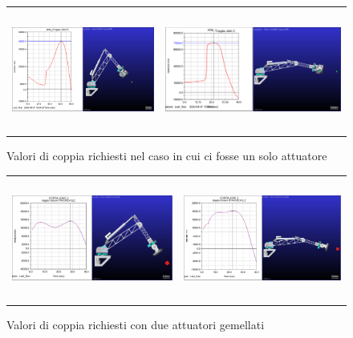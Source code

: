 \documentclass[%
corpo=11pt,
twoside,
 stile=classica,
oldstyle,
greek,%
]{toptesi}
\begin{document}
		\begin{figure}[!ht]
			\centering
			\begin{tabular}{ll}
				\includegraphics[height=4cm,keepaspectratio]{Plots/SPALLA/1motore/JOINT2_conservativo.png}
				&
				\includegraphics[height=4cm,keepaspectratio]{Plots/SPALLA/1motore/JOINT2-torque.png}
			\end{tabular}
			\caption{Valori di coppia richiesti nel caso in cui ci fosse un solo attuatore}
			\label{fig:MBDJoint21motore}
		\end{figure}
		\begin{figure} [!ht]
			\centering
			\begin{tabular}{ll}
				\includegraphics[height=4cm,keepaspectratio]{Plots/SPALLA/2motori/JOINT22favorevole.png}
				&
				\includegraphics[height=4cm,keepaspectratio]{Plots/SPALLA/2motori/JOINT22sfavorevole.png}
			\end{tabular}
			\caption{Valori di coppia richiesti con due attuatori gemellati}
			\label{fig:MBDJoint22motore}
		\end{figure}
\end{document}
